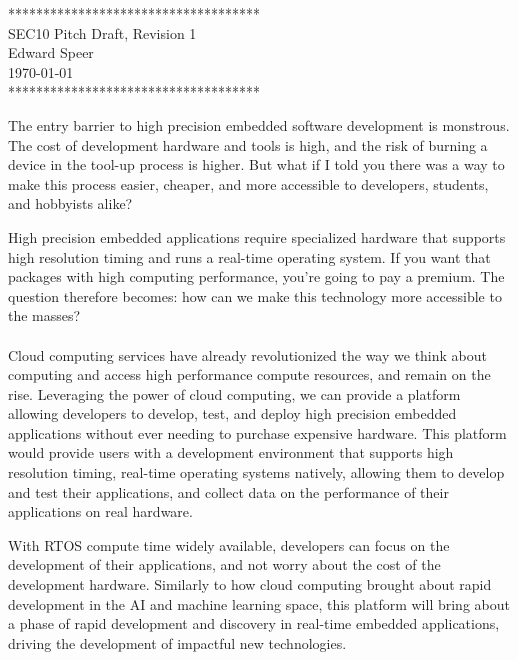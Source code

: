 \documentclass{article}
\newcommand{\HWNUM}{1}
\begin{document}

    \begin{center}
        ************************************ \\
        SEC10 Pitch Draft, Revision \HWNUM \\
        Edward Speer \\
        \today \\
        ************************************
    \end{center}

    The entry barrier to high precision embedded software development is 
    monstrous. The cost of development hardware and tools is high, and the 
    risk of burning a device in the tool-up process is higher. But what if I told
    you there was a way to make this process easier, cheaper, and more accessible
    to developers, students, and hobbyists alike?
    
    High precision embedded applications require specialized hardware that
    supports high resolution timing and runs a real-time operating system. 
    If you want that packages with high computing performance, you're going to 
    pay a premium. The question therefore becomes: how can we make this
    technology more accessible to the masses? \\ \hfill \\

    Cloud computing services have already revolutionized the way we think about
    computing and access high performance compute resources, and remain on 
    the rise. Leveraging the power of cloud computing, we can provide a 
    platform allowing developers to develop, test, and deploy high precision 
    embedded applications without ever needing to purchase expensive hardware. 
    This platform would provide users with a development environment that 
    supports high resolution timing, real-time operating systems natively, 
    allowing them to develop and test their applications, and collect data on 
    the performance of their applications on real hardware.

    With RTOS compute time widely available, developers can focus on the
    development of their applications, and not worry about the cost of
    the development hardware. Similarly to how cloud computing brought about 
    rapid development in the AI and machine learning space, this platform
    will bring about a phase of rapid development and discovery in real-time 
    embedded applications, driving the development of impactful new technologies.
\end{document}
